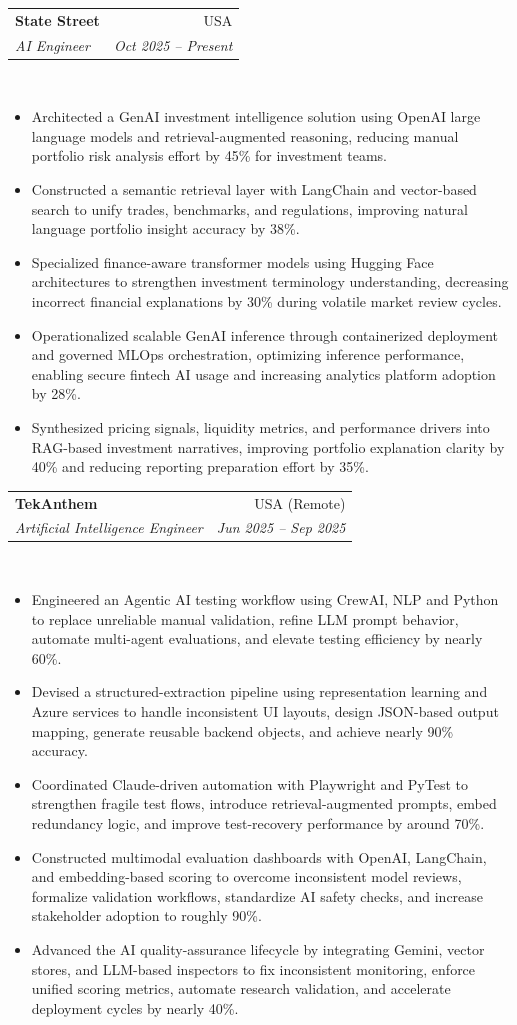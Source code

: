 \documentclass[letterpaper,11pt]{article}
\newcommand{\resumeItem}[1]{\item\small{{#1 \vspace{-3pt}}}}
\newcommand{\resumeSubheading}[4]{
  \vspace{-3pt}\item
    \begin{tabularx}{0.995\textwidth}[t]{Xr}
      \textbf{#1} & #2 \\
      \textit{\small#3} & \textit{\small #4} \\
    \end{tabularx}\\[-3pt]
    \vspace{3pt}
}
\newcommand{\resumeItemListStart}{\begin{itemize}}
\newcommand{\resumeItemListEnd}{\end{itemize}\vspace{-4pt}}
\begin{document}
\resumeSubheading
{State Street}{USA}
{AI Engineer}{Oct 2025 – Present}
\resumeItemListStart
\resumeItem{Architected a GenAI investment intelligence solution using OpenAI large language models and retrieval-augmented reasoning, reducing manual portfolio risk analysis effort by 45\% for investment teams.}
\resumeItem{Constructed a semantic retrieval layer with LangChain and vector-based search to unify trades, benchmarks, and regulations, improving natural language portfolio insight accuracy by 38\%.}
\resumeItem{Specialized finance-aware transformer models using Hugging Face architectures to strengthen investment terminology understanding, decreasing incorrect financial explanations by 30\% during volatile market review cycles.}
\resumeItem{Operationalized scalable GenAI inference through containerized deployment and governed MLOps orchestration, optimizing inference performance, enabling secure fintech AI usage and increasing analytics platform adoption by 28\%.}
\resumeItem{Synthesized pricing signals, liquidity metrics, and performance drivers into RAG-based investment narratives, improving portfolio explanation clarity by 40\% and reducing reporting preparation effort by 35\%.}
\resumeItemListEnd

\resumeSubheading
{TekAnthem}{USA (Remote)}
{Artificial Intelligence Engineer}{Jun 2025 – Sep 2025}
\resumeItemListStart
\resumeItem{Engineered an Agentic AI testing workflow using CrewAI, NLP and Python to replace unreliable manual validation, refine LLM prompt behavior, automate multi-agent evaluations, and elevate testing efficiency by nearly 60\%.}
\resumeItem{Devised a structured-extraction pipeline using representation learning and Azure services to handle inconsistent UI layouts, design JSON-based output mapping, generate reusable backend objects, and achieve nearly 90\% accuracy.}
\resumeItem{Coordinated Claude-driven automation with Playwright and PyTest to strengthen fragile test flows, introduce retrieval-augmented prompts, embed redundancy logic, and improve test-recovery performance by around 70\%.}
\resumeItem{Constructed multimodal evaluation dashboards with OpenAI, LangChain, and embedding-based scoring to overcome inconsistent model reviews, formalize validation workflows, standardize AI safety checks, and increase stakeholder adoption to roughly 90\%.}
\resumeItem{Advanced the AI quality-assurance lifecycle by integrating Gemini, vector stores, and LLM-based inspectors to fix inconsistent monitoring, enforce unified scoring metrics, automate research validation, and accelerate deployment cycles by nearly 40\%.}
\resumeItemListEnd
\end{document}
